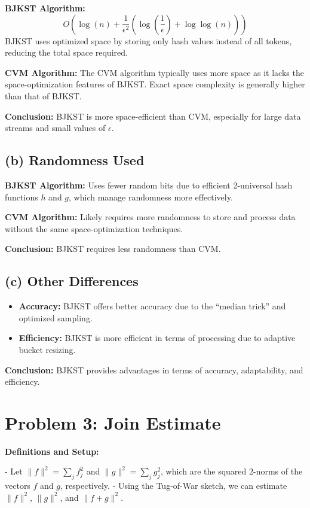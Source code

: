\documentclass[12pt,letterpaper]{article}
\begin{document}
\textbf{BJKST Algorithm:}
\[
O\left(\log(n) + \frac{1}{\epsilon^2} \left(\log\left(\frac{1}{\epsilon}\right) + \log \log(n)\right)\right)
\]
BJKST uses optimized space by storing only hash values instead of all tokens, reducing the total space required.

\textbf{CVM Algorithm:}
The CVM algorithm typically uses more space as it lacks the space-optimization features of BJKST. Exact space complexity is generally higher than that of BJKST.

\textbf{Conclusion:} BJKST is more space-efficient than CVM, especially for large data streams and small values of \( \epsilon \).

\subsection*{(b) Randomness Used}

\textbf{BJKST Algorithm:}
Uses fewer random bits due to efficient 2-universal hash functions \( h \) and \( g \), which manage randomness more effectively.

\textbf{CVM Algorithm:}
Likely requires more randomness to store and process data without the same space-optimization techniques.

\textbf{Conclusion:} BJKST requires less randomness than CVM.

\subsection*{(c) Other Differences}

\begin{itemize}
    \item \textbf{Accuracy:} BJKST offers better accuracy due to the “median trick” and optimized sampling.
    \item \textbf{Efficiency:} BJKST is more efficient in terms of processing due to adaptive bucket resizing.
\end{itemize}

\textbf{Conclusion:} BJKST provides advantages in terms of accuracy, adaptability, and efficiency.

\section*{Problem 3: Join Estimate}



\textbf{Definitions and Setup:}

- Let \( \|f\|^2 = \sum_{j} f_j^2 \) and \( \|g\|^2 = \sum_{j} g_j^2 \), which are the squared 2-norms of the vectors \( f \) and \( g \), respectively.
- Using the Tug-of-War sketch, we can estimate \( \|f\|^2 \), \( \|g\|^2 \), and \( \|f + g\|^2 \).
\end{document}
